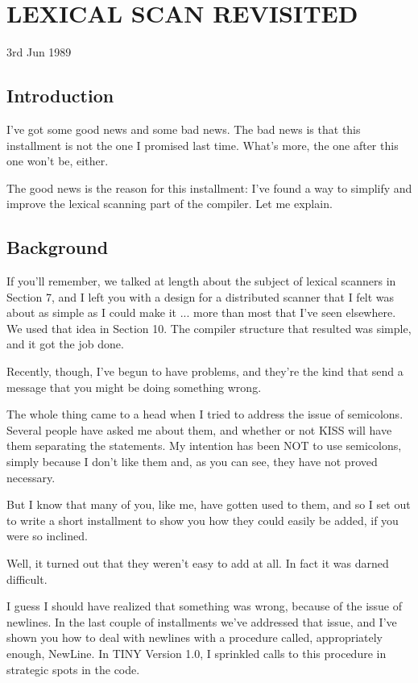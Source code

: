 
\chapter{LEXICAL SCAN REVISITED}

3rd Jun 1989

\section{Introduction}

I've got some  good news and some bad news. The bad news is that this installment is  not  the  one  I promised last time. What's more, the one after this one won't be, either.

The good news is the reason for this installment:  I've  found  a way  to simplify and improve the lexical  scanning  part  of  the compiler. Let me explain.

\section{Background}

If  you'll remember, we talked at length  about  the  subject  of lexical  scanners in Section 7, and I left you with a design for a distributed scanner that I felt was about as simple  as  I  could make it ... more than most that I've  seen  elsewhere. We used that idea in Section 10. The compiler structure that  resulted  was simple, and it got the job done.

Recently, though, I've begun  to  have  problems, and they're the kind that send a message that you might be doing something wrong.

The  whole thing came to a head when I tried to address the issue of  semicolons. Several people have asked  me  about  them, and whether or not KISS will have them separating the statements. My intention has been NOT to  use semicolons, simply because I don't like them and, as you can see, they have not proved necessary.

But I know that many of you, like me, have  gotten  used to them, and so  I  set  out  to write a short installment to show you how they could easily be added, if you were so inclined.

Well, it  turned  out  that  they weren't easy to add at all. In fact it was darned difficult.

I guess I should have  realized that something was wrong, because of the issue  of  newlines. In the last couple of installments we've addressed that issue, and  I've shown you how to deal with newlines with a  procedure called, appropriately enough, NewLine. In  TINY  Version  1.0, I  sprinkled calls to this procedure  in strategic spots in the code.

